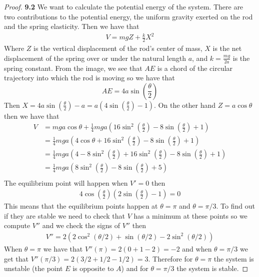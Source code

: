 \documentclass[11pt]{article}
\theoremstyle{definition}
\begin{document}
\begin{proof}{\textbf{9.2}}
        We want to calculate the potential energy of the system.
        There are two contributions to the potential energy, the uniform
        gravity exerted on the rod and the spring elasticity. Then we have that
        \begin{align*}
            V = mgZ + \frac{k}{2}X^2
        \end{align*}
        Where $Z$ is the vertical displacement of the rod's center of mass,
        $X$ is the net displacement of the spring over or under the natural
        length $a$, and $k = \frac{mg}{2a}$ is the spring constant. 
        From the image, we see that $AE$ is a chord of the circular trajectory
        into which the rod is moving so we have that
        $$AE = 4a\sin(\frac{\theta}{2})$$
        Then $X =4a\sin(\frac{\theta}{2}) - a = a(4\sin(\frac{\theta}{2}) - 1)$.
        On the other hand $Z = a \cos \theta$ then we have that
        \begin{align*}
            V &= mga\cos\theta + \frac{1}{4}mga
            \left(16\sin^2\left(\frac{\theta}{2}\right)
                -8\sin(\frac{\theta}{2}) + 1\right)\\
                &=\frac{1}{4}mga\left(4\cos\theta + 16\sin^2\left(\frac{\theta}{2}\right)
                -8\sin(\frac{\theta}{2}) + 1\right)\\
                &=\frac{1}{4}mga\left(4 - 8\sin^2\left(\frac{\theta}{2}\right)
                    + 16\sin^2\left(\frac{\theta}{2}\right)
                    -8\sin(\frac{\theta}{2}) + 1\right)\\
                &=\frac{1}{4}mga\left(8\sin^2\left(\frac{\theta}{2}\right)
                    -8\sin(\frac{\theta}{2}) + 5\right)\\
                \end{align*}
        The equilibrium point will happen when $V'=0$ then
        \begin{align*}
            4\cos\left(\frac{\theta}{2}\right)\left(2\sin(\frac{\theta}{2}) - 1\right) = 0
        \end{align*}
        This means that the equilibrium points happen at $\theta = \pi$ and
        $\theta = \pi/3$.
        To find out if they are stable we need to check that $V$ has a minimum
        at these points so we compute $V''$ and we check the signs of $V''$ then
        \begin{align*}
            V'' = 2(2 \cos^2(\theta/2) + \sin(\theta/2) - 2 \sin^2(\theta/2))
        \end{align*}
        When $\theta = \pi$ we have that $V''(\pi)= 2(0 + 1 - 2) = -2$ and when
        $\theta = \pi/3$ we get that $V''(\pi/3)= 2(3/2 + 1/2 - 1/2) = 3$.
        Therefore for $\theta = \pi$ the system is unstable (the point $E$ is
        opposite to $A$) and for $\theta= \pi/3$ the system is stable.
    \end{proof}
\end{document}
